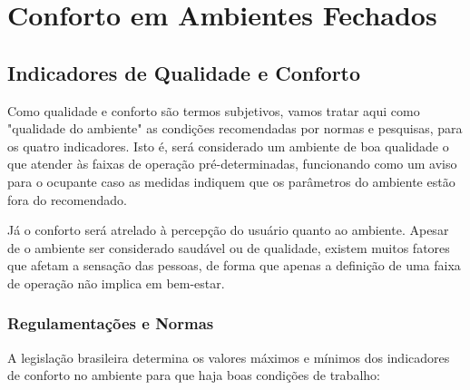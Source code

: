 \documentclass[]{politex}
\begin{document}
\chapter{Conforto em Ambientes Fechados} %

\section{Indicadores de Qualidade e Conforto} %


Como qualidade e conforto são termos subjetivos, vamos tratar aqui como "qualidade do ambiente" as condições recomendadas por normas e pesquisas, para os quatro indicadores. Isto é, será considerado um ambiente de boa qualidade o que atender às faixas de operação pré-determinadas, funcionando como um aviso para o ocupante caso as medidas indiquem que os parâmetros do ambiente estão fora do recomendado. 

Já o conforto será atrelado à percepção do usuário quanto ao ambiente. Apesar de o ambiente ser considerado saudável ou de qualidade, existem muitos fatores que afetam a sensação das pessoas, de forma que apenas a definição de uma faixa de operação não implica em bem-estar. 

\subsection{Regulamentações e Normas} %

A legislação brasileira determina os valores máximos e mínimos dos indicadores de conforto no ambiente para que haja boas condições de trabalho: 
\end{document}

